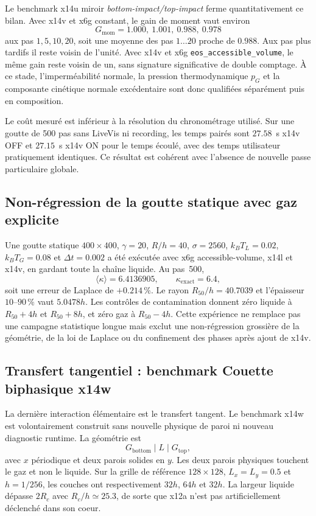 \documentclass[11pt,a4paper]{article}
\begin{document}
Le benchmark x14u miroir \emph{bottom-impact/top-impact} ferme quantitativement ce bilan. Avec x14v et x6g constant, le gain de moment vaut environ
\begin{equation}
  G_{\mathrm{mom}}
  =
  1.000,\ 1.001,\ 0.988,\ 0.978
\end{equation}
aux pas $1,5,10,20$, soit une moyenne des pas $1\ldots20$ proche de $0.988$. Aux pas plus tardifs il reste voisin de l'unité. Avec x14v et x6g \nolinkurl{eos_accessible_volume}, le même gain reste voisin de un, sans signature significative de double comptage. À ce stade, l'imperméabilité normale, la pression thermodynamique $p_G$ et la composante cinétique normale excédentaire sont donc qualifiées séparément puis en composition.

Le coût mesuré est inférieur à la résolution du chronométrage utilisé. Sur une goutte de 500 pas sans LiveVis ni recording, les temps pairés sont $27.58$~s x14v OFF et $27.15$~s x14v ON pour le temps écoulé, avec des temps utilisateur pratiquement identiques. Ce résultat est cohérent avec l'absence de nouvelle passe particulaire globale.

\subsection{Non-régression de la goutte statique avec gaz explicite}

Une goutte statique $400\times400$, $\gamma=20$, $R/h=40$, $\sigma=2560$, $k_BT_L=0.02$, $k_BT_G=0.08$ et $\Delta t=0.002$ a été exécutée avec x6g accessible-volume, x14l et x14v, en gardant toute la chaîne liquide. Au pas~500,
\begin{equation}
  \langle\kappa\rangle = 6.4136905,
  \qquad
  \kappa_{\mathrm{exact}}=6.4,
\end{equation}
soit une erreur de Laplace de $+0.214\,\%$. Le rayon $R_{50}/h=40.7039$ et l'épaisseur $10$--$90\,\%$ vaut $5.0478h$. Les contrôles de contamination donnent zéro liquide à $R_{50}+4h$ et $R_{50}+8h$, et zéro gaz à $R_{50}-4h$. Cette expérience ne remplace pas une campagne statistique longue mais exclut une non-régression grossière de la géométrie, de la loi de Laplace ou du confinement des phases après ajout de x14v.

\subsection{Transfert tangentiel : benchmark Couette biphasique x14w}

La dernière interaction élémentaire est le transfert tangent. Le benchmark x14w est volontairement construit sans nouvelle physique de paroi ni nouveau diagnostic runtime. La géométrie est
\begin{equation}
  G_{\mathrm{bottom}}\;|\;L\;|\;G_{\mathrm{top}},
\end{equation}
avec $x$ périodique et deux parois solides en $y$. Les deux parois physiques touchent le gaz et non le liquide. Sur la grille de référence $128\times128$, $L_x=L_y=0.5$ et $h=1/256$, les couches ont respectivement $32h$, $64h$ et $32h$. La largeur liquide dépasse $2R_c$ avec $R_c/h\simeq25.3$, de sorte que x12a n'est pas artificiellement déclenché dans son coeur.
\end{document}

